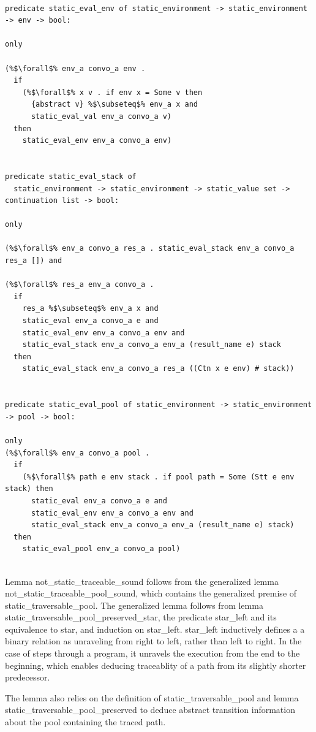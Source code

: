 \documentclass{article}
\begin{document}
\begin{lstlisting}[language=logic, escapechar=\%]

predicate static_eval_env of static_environment -> static_environment -> env -> bool:

only 

(%$\forall$% env_a convo_a env .
  if
    (%$\forall$% x v . if env x = Some v then
      {abstract v} %$\subseteq$% env_a x and
      static_eval_val env_a convo_a v)
  then 
    static_eval_env env_a convo_a env)


predicate static_eval_stack of
  static_environment -> static_environment -> static_value set -> continuation list -> bool:

only 

(%$\forall$% env_a convo_a res_a . static_eval_stack env_a convo_a res_a []) and

(%$\forall$% res_a env_a convo_a . 
  if 
    res_a %$\subseteq$% env_a x and
    static_eval env_a convo_a e and
    static_eval_env env_a convo_a env and
    static_eval_stack env_a convo_a env_a (result_name e) stack 
  then
    static_eval_stack env_a convo_a res_a ((Ctn x e env) # stack))


predicate static_eval_pool of static_environment -> static_environment -> pool -> bool:

only
(%$\forall$% env_a convo_a pool .
  if
    (%$\forall$% path e env stack . if pool path = Some (Stt e env stack) then 
      static_eval env_a convo_a e and
      static_eval_env env_a convo_a env and
      static_eval_stack env_a convo_a env_a (result_name e) stack)
  then 
    static_eval_pool env_a convo_a pool)


\end{lstlisting}
Lemma not\_static\_traceable\_sound follows from the generalized lemma
not\_static\_traceable\_pool\_sound, which contains the generalized premise of
static\_traversable\_pool. The generalized lemma follows from lemma
static\_traversable\_pool\_preserved\_star, the predicate star\_left and its equivalence to star,
and induction on star\_left. star\_left inductively defines a a binary relation as unraveling
from right to left, rather than left to right.  In the case of steps through a program, it
unravels the execution from the end to the beginning, which enables deducing traceablity of a
path from its slightly shorter predecessor.  

The lemma also relies on the definition of static\_traversable\_pool
and lemma static\_traversable\_pool\_preserved to deduce abstract transition information about the
pool containing the traced path.
\end{document}
